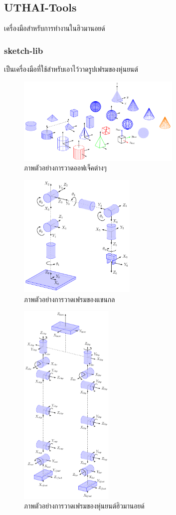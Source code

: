 \subsection*{UTHAI-Tools}
เครื่องมือสำหรับการทำงานในฮิวมานอยด์

\subsubsection*{sketch-lib}
เป็นเครื่องมือที่ใช้สำหรับเอาไว้วาดรูปเฟรมของหุ่นยนต์

\begin{figure}[ht]
	\centering
	\includegraphics[width=0.7\textwidth]{chapter3/images/basic-shapes.png}
	\caption{ภาพตัวอย่างการวาดออฟเจ็คต่างๆ}
	\label{fig:basic-shapes_sk}
\end{figure}
\begin{figure}[ht]
	\centering
	\includegraphics[width=0.5\textwidth]{chapter3/images/test_robot.png}
	\caption{ภาพตัวอย่างการวาดเฟรมของแขนกล}
	\label{fig:test-robot_sk}
\end{figure}
\begin{figure}[ht]
	\centering
	\includegraphics[width=0.4\textwidth]{chapter3/images/uthai_kinematics.png}
	\caption{ภาพตัวอย่างการวาดเฟรมของหุ่นยนต์ฮิวมานอยด์}
	\label{fig:uthai_kinematics_sk}
\end{figure}